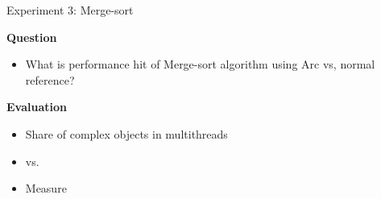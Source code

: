 \documentclass[9pt]{beamer}
\begin{document}
\begin{frame}[fragile]{Experiment 3: Merge-sort}

    \textbf{Question}
    \begin{itemize}
        \item What is performance hit of Merge-sort algorithm using Arc vs, normal reference?
    \end{itemize}

    \vspace{0.5cm}

    \textbf{Evaluation}
    \begin{itemize}
        \item Share  of complex objects in multithreads
        \item {} vs. 
        \item Measure 
    \end{itemize}
\end{frame}


% 

\end{document}
